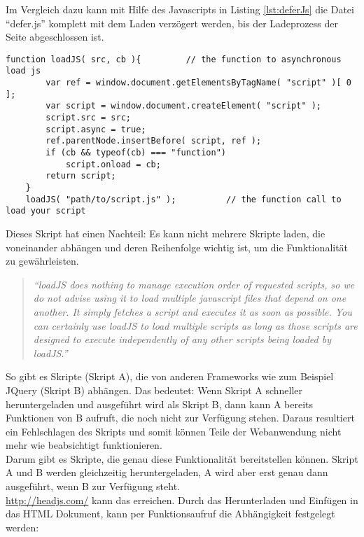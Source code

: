 				Im Vergleich dazu kann mit Hilfe des Javascripts in Listing \ref{lst:deferJs} die Datei "`defer.js"' komplett mit dem Laden verzögert werden, bis der Ladeprozess der Seite abgeschlossen ist.
\begin{lstlisting}[captionpos=b, caption=Javascript nach \autocite{deferJS}, label=lst:deferJs]
	function loadJS( src, cb ){			// the function to asynchronous load js
		var ref = window.document.getElementsByTagName( "script" )[ 0 ];
		var script = window.document.createElement( "script" );
		script.src = src;
		script.async = true;
		ref.parentNode.insertBefore( script, ref );
		if (cb && typeof(cb) === "function")
			script.onload = cb;
		return script;
	}
	loadJS( "path/to/script.js" );			// the function call to load your script
\end{lstlisting}

				Dieses Skript hat einen Nachteil: Es kann nicht mehrere Skripte laden, die voneinander abhängen und deren Reihenfolge wichtig ist, um die Funktionalität zu gewährleisten. 

				\begin{quote}
					\textit{"`loadJS does nothing to manage execution order of requested scripts, so we do not advise using it to load multiple javascript files that depend on one another. It simply fetches a script and executes it as soon as possible. You can certainly use loadJS to load multiple scripts as long as those scripts are designed to execute independently of any other scripts being loaded by loadJS."'\autocite{deferJS}}
				\end{quote}

				So gibt es Skripte (Skript A), die von anderen Frameworks wie zum Beispiel JQuery (Skript B) abhängen. Das bedeutet: Wenn Skript A schneller heruntergeladen und ausgeführt wird als Skript B, dann kann A bereits Funktionen von B aufruft, die noch nicht zur Verfügung stehen. Daraus resultiert ein Fehlschlagen des Skripts und somit können Teile der Webanwendung nicht mehr wie beabsichtigt funktionieren.\\

				Darum gibt es Skripte, die genau diese Funktionalität bereitstellen können. Skript A und B werden gleichzeitig heruntergeladen, A wird aber erst genau dann ausgeführt, wenn B zur Verfügung steht.\\

				\url{http://headjs.com/} kann das erreichen. Durch das Herunterladen und Einfügen in das HTML Dokument, kann per Funktionsaufruf die Abhängigkeit festgelegt werden:

